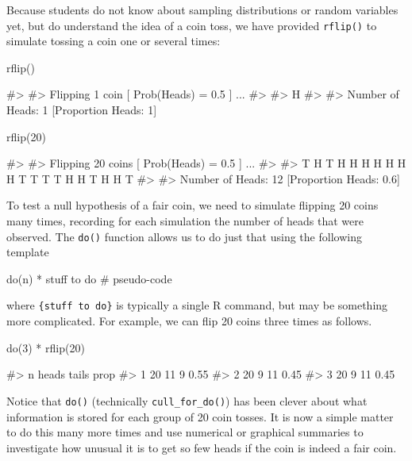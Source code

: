 Because students do not know about sampling distributions or random
variables yet, but do understand the idea of a coin toss, we have
provided \texttt{rflip()} to simulate tossing a coin one or several
times:

\begin{Schunk}
\begin{Sinput}
rflip()
\end{Sinput}
\begin{Soutput}
#> 
#> Flipping 1 coin [ Prob(Heads) = 0.5 ] ...
#> 
#> H
#> 
#> Number of Heads: 1 [Proportion Heads: 1]
\end{Soutput}
\begin{Sinput}
rflip(20)
\end{Sinput}
\begin{Soutput}
#> 
#> Flipping 20 coins [ Prob(Heads) = 0.5 ] ...
#> 
#> T H T H H H H H H H T T T T H H T H H T
#> 
#> Number of Heads: 12 [Proportion Heads: 0.6]
\end{Soutput}
\end{Schunk}

To test a null hypothesis of a fair coin, we need to simulate flipping
20 coins many times, recording for each simulation the number of heads
that were observed. The \texttt{do()} function allows us to do just that
using the following template

\begin{Schunk}
\begin{Sinput}
do(n) * {stuff to do}             # pseudo-code
\end{Sinput}
\end{Schunk}

\noindent
where \texttt{\{stuff\ to\ do\}} is typically a single R command, but
may be something more complicated. For example, we can flip 20 coins
three times as follows.

\begin{Schunk}
\begin{Sinput}
do(3) * rflip(20)
\end{Sinput}
\begin{Soutput}
#>    n heads tails prop
#> 1 20    11     9 0.55
#> 2 20     9    11 0.45
#> 3 20     9    11 0.45
\end{Soutput}
\end{Schunk}

\noindent
Notice that \texttt{do()} (technically \texttt{cull\_for\_do()}) has
been clever about what information is stored for each group of 20 coin
tosses. It is now a simple matter to do this many more times and use
numerical or graphical summaries to investigate how unusual it is to get
so few heads if the coin is indeed a fair coin.

